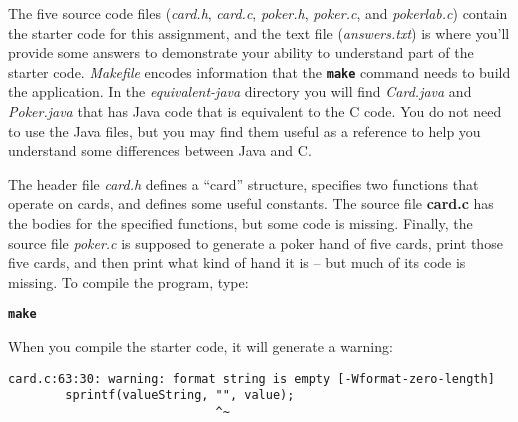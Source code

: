 \begin{description}
\end{description}

The five source code files (\textit{card.h}, \textit{card.c}, \textit{poker.h}, \textit{poker.c}, and \textit{pokerlab.c}) contain the starter code for this assignment, and the text file (\textit{answers.txt}) is where you'll provide some answers to demonstrate your ability to understand part of the starter code.
\textit{Makefile} encodes information that the \textbf{\texttt{make}} command needs to build the application.
In the \mbox{\textit{equivalent-java}} directory you will find \textit{Card.java} and \textit{Poker.java} that has Java code that is equivalent to the C code.
You do not need to use the Java files, but you may find them useful as a reference to help you understand some differences between Java and C\@.

The header file \textit{card.h} defines a ``card'' structure, specifies two functions that operate on cards, and defines some useful constants.
The source file \textbf{card.c} has the bodies for the specified functions, but some code is missing.
Finally, the source file \textit{poker.c} is supposed to generate a poker hand of five cards, print those five cards, and then print what kind of hand it is -- but much of its code is missing.
To compile the program, type:

\textbf{\texttt{make}}

When you compile the starter code, it will generate a warning:

\begin{verbatim}
card.c:63:30: warning: format string is empty [-Wformat-zero-length]
        sprintf(valueString, "", value);
                             ^~
\end{verbatim}

